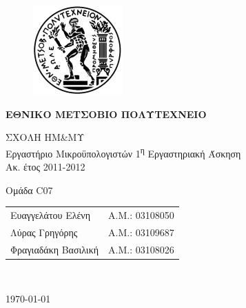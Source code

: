 \begin{titlepage}
\begin{center}
\begin{figure}[t] 
     \includegraphics[scale=0.7]{title/ntua_logo}
\end{figure}
\begin{LARGE}\textbf{ΕΘΝΙΚΟ ΜΕΤΣΟΒΙΟ ΠΟΛΥΤΕΧΝΕΙΟ\\}\end{LARGE}
\vspace{2cm}
\begin{Large}
ΣΧΟΛΗ ΗΜ\&ΜΥ\\
Εργαστήριο Μικροϋπολογιστών
1\textsuperscript{η} Εργαστηριακή Άσκηση\\
Ακ. έτος 2011-2012\\
\end{Large}
\vspace{5cm}
\Large Ομάδα C07\\
\vspace{1cm}
\begin{tabular}{l r}
\Large{Ευαγγελάτου Ελένη}&
\large{Α.Μ.: 03108050}\\
\Large{Λύρας Γρηγόρης}&
\large{Α.Μ.: 03109687}\\
\Large{Φραγιαδάκη Βασιλική}&
\large{Α.Μ.: 03108026}\\
\end{tabular}\\
\vspace{5cm}

\vfill
\large\today\\
\end{center}
\end{titlepage}

